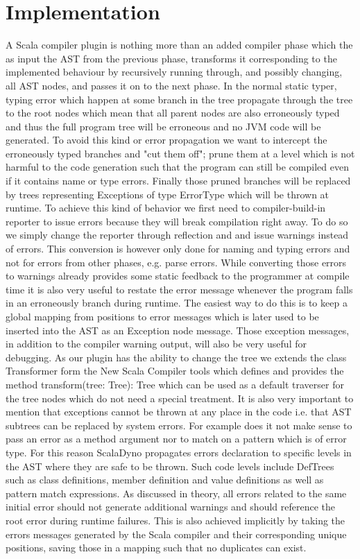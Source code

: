  \section{Implementation}
 A Scala compiler plugin is nothing more than an added compiler phase which the as input the AST from the previous phase, transforms it corresponding to the implemented behaviour by recursively running through, and possibly changing, all AST nodes, and passes it on to the next phase. In the normal static typer, typing error which happen at some branch in the tree propagate  through the tree to the root nodes which mean that all parent nodes are also erroneously typed and thus the full program tree will be erroneous and no JVM code will be generated. To avoid this kind or error propagation we want to intercept the erroneously typed branches and "cut them off"; prune them at a level which is not harmful to the code generation such that the program can still be compiled even if it contains name or type errors. Finally those pruned branches will be replaced by trees representing Exceptions of type {\ttfamily ErrorType} which will be thrown at runtime. To achieve  this kind of behavior we first need to compiler-build-in reporter to issue errors because they will break compilation right away. To do so we simply change the reporter through reflection and and issue warnings instead of errors. This conversion is however only done for naming and typing errors and not for errors from other phases, e.g. parse errors. While converting those errors to warnings already provides some static feedback to the programmer at compile time it is also very useful to restate the error message whenever the program falls in an erroneously branch during runtime. The easiest way to do this is to keep a global mapping from positions to error messages which is later used to be inserted into the AST as an Exception node message. Those exception messages, in addition to the compiler warning output, will also be very useful for debugging. As our plugin has the ability to change the tree we extends the class {\ttfamily Transformer} form the New Scala Compiler tools which defines and provides the method {\ttfamilydef transform(tree: Tree): Tree} which can be used as a default traverser for the tree nodes which do not need a special treatment.
It is also very important to mention that exceptions cannot be thrown at any place in the code i.e. that AST subtrees can be replaced by system errors. For example does it not make sense to pass an error as a method argument nor to match on a pattern which is of error type. For this reason ScalaDyno propagates errors declaration to specific levels in the AST where they are safe to be thrown. Such code levels include {\ttfamily DefTree}s such as class definitions, member definition and value definitions as well as {\ttfamily pattern match} expressions. As discussed in {theory}, all errors related to the same initial error should not generate additional warnings and should reference the root error during runtime failures. This is also achieved implicitly by taking the errors messages generated by the Scala compiler and their corresponding unique positions, saving those in a mapping such that no duplicates can exist.